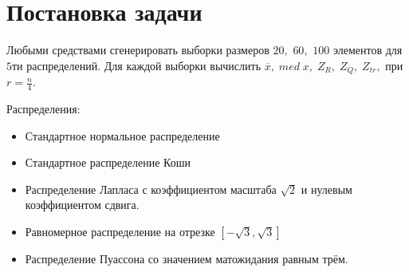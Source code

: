 \documentclass[a4]{article}
\begin{document}



\newpage
\tableofcontents{}
\newpage

\section{Постановка задачи}

Любыми средствами сгенерировать выборки размеров $20,$ $60,$ $100$ элементов для $5$ти распределений. Для каждой выборки вычислить $\overline{x},\; med\; x,\; Z_R,\; Z_Q,\; Z_{tr},$ при $r = \frac{n}{4}.$

Распределения:
\begin{itemize}
\item Стандартное нормальное распределение
\item Стандартное распределение Коши
\item Распределение Лапласа с коэффициентом масштаба $\sqrt{2}$ и нулевым коэффициентом сдвига.
\item Равномерное распределение на отрезке $\left[-\sqrt{3}, \sqrt{3}\right]$
\item Распределение Пуассона со значением матожидания равным трём.
\end{itemize}

\end{document}
